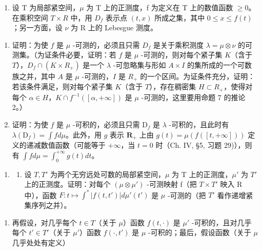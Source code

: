 \begin{enumerate}
\def\labelenumi{\arabic{enumi})}
\setcounter{enumi}{2}
\tightlist
\item
  设 T 为局部紧空间，\(\mu\) 为 T 上的正测度，f 为定义在 T 上的数值函数 \(\geqslant 0\)。在乘积空间 \(T \times R\) 中，用 \(D_{f}\) 表示点 \((t, x)\) 所成之集，其中 \(0 \leqslant x \leqslant f(t)\)；另一方面，设 \(\nu\) 为 R 上的 Lebesgue 测度。
\end{enumerate}

\begin{enumerate}
\def\labelenumi{\alph{enumi})}
\item
  证明：为使 \(f\) 是 \(\mu\) -可测的，必须且只需 \(D_f\) 是关于乘积测度 \(\lambda = \mu \otimes \nu\) 的可测集。（为证条件必要，证明：若 \(f\) 是 \(\mu\) -可测的，则对每个紧子集 \(K\)（含于 \(T\)），\(D_f \cap (K \times R_+)\) 是一个 \(\lambda\) -可忽略集与形如 \(A \times I\) 的集所成的一个可数族之并，其中 \(A\) 是 \(\mu\) -可测的，\(I\) 是 \(R_+\) 的一个区间。为证条件充分，证明：若该条件满足，则对每个紧子集 \(K\)（含于 \(T\)），存在稠密集 \(H \subset R_+\)，使得对每个 \(\alpha \in H\)，\(K \cap f^{-1}([\alpha, +\infty])\) 是 \(\mu\) -可测的，这里要用命题 7 的推论 2。）
\item
  证明：为使 \(f\) 是 \(\mu\) -可积的，必须且只需 \(\mathrm{D}_f\) 是 \(\lambda\) -可积的，且此时有 \(\lambda(\mathrm{D}_f) = \int f d\mu\)。此外，用 \(g\) 表示 \(\mathbf{R}_+\) 上由 \(g(t) = \mu\left( f([t, +\infty]) \right)\) 定义的递减数值函数（可能等于 \(+\infty\)，当 \(t = 0\) 时（Ch. IV, §5, 习题 29)），则有 \(\int f d\mu = \int_0^{+\infty} g(t) dt\)。
\end{enumerate}

\begin{enumerate}
\def\labelenumi{\arabic{enumi})}
\setcounter{enumi}{3}
\tightlist
\item
  \begin{enumerate}
  \def\labelenumii{\alph{enumii})}
  \tightlist
  \item
    设 \(T, T'\) 为两个无穷远处可数的局部紧空间，\(\mu\) 为 T 上的正测度，\(\mu'\) 为 \(T'\) 上的正测度。证明：对每个 \((\mu \otimes \mu')\) -可测映射 f（把 \(T \times T'\) 映入 R 中），函数 \(F : t \mapsto \int^{*} |f(t, t')| d\mu'(t')\) 是 \(\mu\) -可测的（把 \(T'\) 看作递增紧集序列之并）。
  \end{enumerate}
\end{enumerate}

\begin{enumerate}
\def\labelenumi{\alph{enumi})}
\setcounter{enumi}{1}
\tightlist
\item
  再假设，对几乎每个 \(t \in T\)（关于 \(\mu\)）函数 \(f(t, \cdot)\) 是 \(\mu'\) -可积的，且对几乎每个 \(t' \in T'\)（关于 \(\mu'\)）函数 \(f(\cdot, t')\) 是 \(\mu\) -可积的；最后，假设函数（关于 \(\mu\) 几乎处处有定义）
\end{enumerate}

